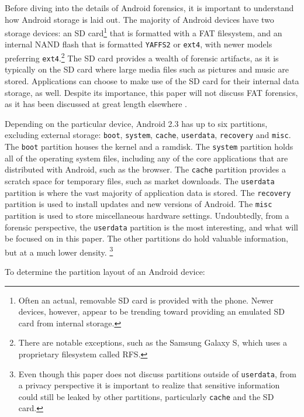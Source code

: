 Before diving into the details of Android forensics, it is important to understand how Android storage is laid out.
The majority of Android devices have two storage devices: an SD card\footnote{Often an actual, removable SD card is provided with
the phone. Newer devices, however, appear to be trending toward providing an emulated SD card from internal storage.} that is
formatted with a FAT filesystem, and an internal NAND flash that is formatted \texttt{YAFFS2} or \texttt{ext4}, with newer models
preferring \texttt{ext4}.\footnote{There are notable exceptions, such as the Samsung Galaxy S, which uses a proprietary filesystem called RFS.} The SD
card provides a wealth of forensic artifacts, as it is typically on the SD card where large media files such as pictures and music
are stored.  Applications can choose to make use of the SD card for their internal data storage, as well.  Despite its importance,
this paper will not discuss FAT forensics, as it has been discussed at great length elsewhere \cite{carrier}. 

Depending on the particular device, Android 2.3 has up to six partitions, excluding external storage: \texttt{boot}, \texttt{system}, \texttt{cache}, \texttt{userdata},
\texttt{recovery} and \texttt{misc}. 
The \texttt{boot} partition houses the kernel and a ramdisk.
The \texttt{system} partition holds all of the operating system files, including any of the core applications that are distributed with Android, such as the browser. 
The \texttt{cache} partition provides a scratch space for temporary files, such as market downloads.
The \texttt{userdata} partition is where the vast majority of application data is stored.
The \texttt{recovery} partition is used to install updates and new versions of Android. 
The \texttt{misc} partition is used to store miscellaneous hardware settings.
Undoubtedly, from a forensic perspective, the \texttt{userdata} partition is the most interesting, and what will be focused on in
this paper. The other partitions do hold valuable information, but at a much lower density.
\footnote{Even though this paper does not discuss partitions outside of \texttt{userdata}, from a privacy perspective it is
important to realize that sensitive information could still be leaked by other partitions, particularly \texttt{cache} and the SD
card.}

To determine the partition layout of an Android device:

